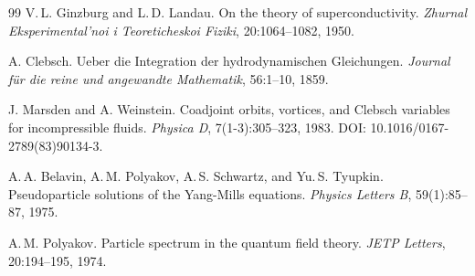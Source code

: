 \documentclass[11pt,a4paper]{article}
\begin{document}
\begin{thebibliography}{99}
	V.\,L. Ginzburg and L.\,D. Landau.
	\newblock On the theory of superconductivity.
	\newblock \textit{Zhurnal Eksperimental'noi i Teoreticheskoi Fiziki}, 20:1064--1082, 1950.
	
	A. Clebsch.
	\newblock Ueber die Integration der hydrodynamischen Gleichungen.
	\newblock \textit{Journal für die reine und angewandte Mathematik}, 56:1--10, 1859.
	
	J. Marsden and A. Weinstein.
	\newblock Coadjoint orbits, vortices, and Clebsch variables for incompressible fluids.
	\newblock \textit{Physica D}, 7(1-3):305--323, 1983.
	\newblock DOI: 10.1016/0167-2789(83)90134-3.
	
	A.\,A. Belavin, A.\,M. Polyakov, A.\,S. Schwartz, and Yu.\,S. Tyupkin.
	\newblock Pseudoparticle solutions of the Yang-Mills equations.
	\newblock \textit{Physics Letters B}, 59(1):85--87, 1975.
	
	A.\,M. Polyakov.
	\newblock Particle spectrum in the quantum field theory.
	\newblock \textit{JETP Letters}, 20:194--195, 1974.
	
\end{thebibliography}
	
\end{document}
